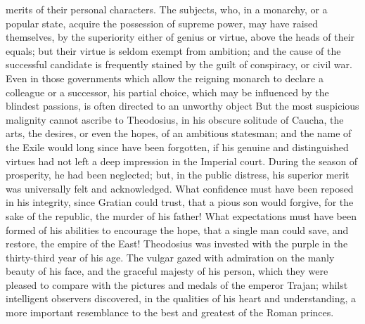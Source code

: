 merits of their personal characters. The subjects, who, in a
monarchy, or a popular state, acquire the possession of supreme
power, may have raised themselves, by the superiority either of
genius or virtue, above the heads of their equals; but their
virtue is seldom exempt from ambition; and the cause of the
successful candidate is frequently stained by the guilt of
conspiracy, or civil war. Even in those governments which allow
the reigning monarch to declare a colleague or a successor, his
partial choice, which may be influenced by the blindest passions,
is often directed to an unworthy object But the most suspicious
malignity cannot ascribe to Theodosius, in his obscure solitude
of Caucha, the arts, the desires, or even the hopes, of an
ambitious statesman; and the name of the Exile would long since
have been forgotten, if his genuine and distinguished virtues had
not left a deep impression in the Imperial court. During the
season of prosperity, he had been neglected; but, in the public
distress, his superior merit was universally felt and
acknowledged. What confidence must have been reposed in his
integrity, since Gratian could trust, that a pious son would
forgive, for the sake of the republic, the murder of his father!
What expectations must have been formed of his abilities to
encourage the hope, that a single man could save, and restore,
the empire of the East! Theodosius was invested with the purple
in the thirty-third year of his age. The vulgar gazed with
admiration on the manly beauty of his face, and the graceful
majesty of his person, which they were pleased to compare with
the pictures and medals of the emperor Trajan; whilst intelligent
observers discovered, in the qualities of his heart and
understanding, a more important resemblance to the best and
greatest of the Roman princes.




